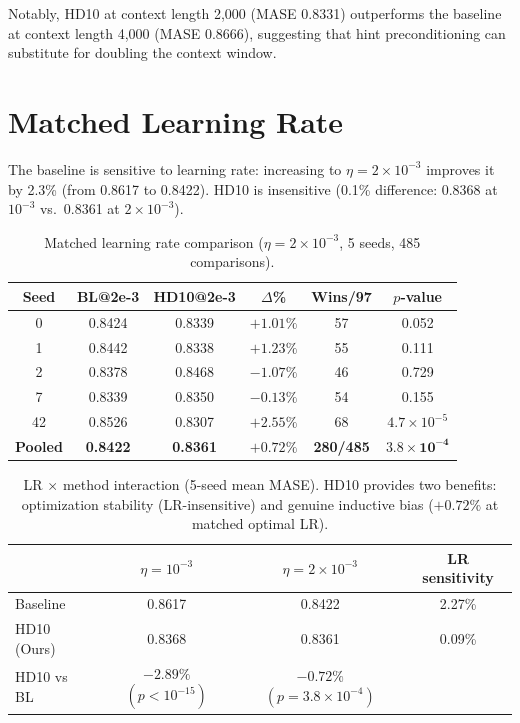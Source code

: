 \documentclass{article}
\begin{document}
Notably, HD10 at context length 2,000 (MASE 0.8331) outperforms the baseline at context length 4,000 (MASE 0.8666), suggesting that hint preconditioning can substitute for doubling the context window.

\section{Matched Learning Rate}
\label{app:matchedlr}

The baseline is sensitive to learning rate: increasing to $\eta = 2 \times 10^{-3}$ improves it by 2.3\% (from 0.8617 to 0.8422). HD10 is insensitive (0.1\% difference: 0.8368 at $10^{-3}$ vs.\ 0.8361 at $2 \times 10^{-3}$).

\begin{table}[h]
\centering
\caption{Matched learning rate comparison ($\eta = 2 \times 10^{-3}$, 5 seeds, 485 comparisons).}
\small
\begin{tabular}{cccccc}
\toprule
\textbf{Seed} & \textbf{BL@2e-3} & \textbf{HD10@2e-3} & \textbf{$\Delta$\%} & \textbf{Wins/97} & \textbf{$p$-value} \\
\midrule
0 & 0.8424 & 0.8339 & $+1.01\%$ & 57 & 0.052 \\
1 & 0.8442 & 0.8338 & $+1.23\%$ & 55 & 0.111 \\
2 & 0.8378 & 0.8468 & $-1.07\%$ & 46 & 0.729 \\
7 & 0.8339 & 0.8350 & $-0.13\%$ & 54 & 0.155 \\
42 & 0.8526 & 0.8307 & $+2.55\%$ & 68 & $4.7 \times 10^{-5}$ \\
\midrule
\textbf{Pooled} & \textbf{0.8422} & \textbf{0.8361} & \textbf{$+0.72\%$} & \textbf{280/485} & $\mathbf{3.8 \times 10^{-4}}$ \\
\bottomrule
\end{tabular}
\end{table}

\begin{table}[h]
\centering
\caption{LR $\times$ method interaction (5-seed mean MASE). HD10 provides two benefits: optimization stability (LR-insensitive) and genuine inductive bias ($+0.72\%$ at matched optimal LR).}
\small
\begin{tabular}{lccc}
\toprule
& $\eta = 10^{-3}$ & $\eta = 2 \times 10^{-3}$ & LR sensitivity \\
\midrule
Baseline & 0.8617 & 0.8422 & 2.27\% \\
HD10 (Ours) & 0.8368 & 0.8361 & 0.09\% \\
\midrule
HD10 vs BL & $-2.89\%$ $(p < 10^{-15})$ & $-0.72\%$ $(p = 3.8 \times 10^{-4})$ & \\
\bottomrule
\end{tabular}
\end{table}
\end{document}
